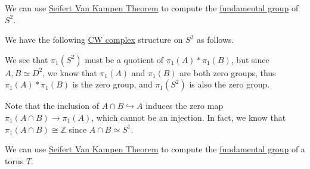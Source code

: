\begin{eg}
	We can use \hyperref[thm:Seifert-Van-Kampen-Theorem]{Seifert Van Kampen Theorem} to compute the \hyperref[def:fundamental-group]{fundamental group}
	of \(S^{2}\).
\end{eg}
\begin{explanation}
	We have the following \hyperref[def:CW-Complex]{CW complex} structure on \(S^2\) as follows.
	\begin{figure}[H]
		\centering
		\label{fig:lec11-eg:2-sphere}
	\end{figure}
	We see that \(\pi _1(S^{2} )\) must be a quotient of \(\pi _1(A)\ast \pi _1(B)\), but since \(A, B\simeq D^{2} \), we know that
	\(\pi _1(A)\) and \(\pi _1(B)\) are both zero groups, thus \(\pi _1(A)\ast \pi _1(B)\) is the zero group, and \(\pi _1(S^{2} )\) is
	also the zero group.
	\begin{remark}
		Note that the inclusion of \(A\cap B\hookrightarrow A\) induces the zero map \(\pi _1(A\cap B)\to \pi _1(A)\), which cannot be an injection.
		In fact, we know that \(\pi _1(A\cap B)\cong \mathbb{Z} \) since \(A\cap B\simeq S^1\).
	\end{remark}
\end{explanation}
\begin{eg}\label{lec11:eg:torus}
	We can use \hyperref[thm:Seifert-Van-Kampen-Theorem]{Seifert Van Kampen Theorem} to compute the \hyperref[def:fundamental-group]{fundamental group}
	of a torus \(T\).
\end{eg}
